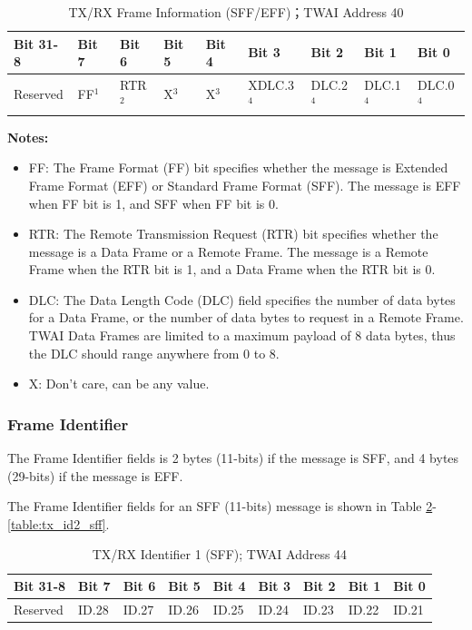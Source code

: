\documentclass[main\_\_EN.tex]{subfiles}
\begin{document}
\begin{longtable}[c]{|p{1.4cm}|p{1.4cm}|p{1.4cm}|p{1.4cm}|p{1.4cm}|p{1.4cm}|p{1.4cm}|p{1.4cm}|p{1.4cm}|}
    \caption{TX/RX Frame Information (SFF/EFF)；TWAI Address \hexprefix{}40}
    \label{table:frame_info}\\
    \hline
       \rowcolor{lightgray}
    Bit 31-8 & Bit 7 & Bit 6 & Bit 5 & Bit 4 & Bit 3 & Bit 2 & Bit 1 & Bit 0\\
    \hline
    Reserved & FF$^1$ & RTR$^2$  & X$^3$  & X$^3$  & XDLC.3$^4$ & DLC.2$^4$ & DLC.1$^4$ & DLC.0$^4$\\
    \hline
\end{longtable}
\vspace{-1.5em}
{\bfseries Notes:}\\
\begin{itemize}
    \item FF: The Frame Format (FF) bit specifies whether the message is Extended Frame Format (EFF) or Standard Frame Format (SFF). The message is EFF when FF bit is 1, and SFF when FF bit is 0.
    \item RTR: The Remote Transmission Request (RTR) bit specifies whether the message is a Data Frame or a Remote Frame. The message is a Remote Frame when the RTR bit is 1, and a Data Frame when the RTR bit is 0.
    \item DLC: The Data Length Code (DLC) field specifies the number of data bytes for a Data Frame, or the number of data bytes to request in a Remote Frame. TWAI Data Frames are limited to a maximum payload of 8 data bytes, thus the DLC should range anywhere from 0 to 8.
    \item X: Don’t care, can be any value.
\end{itemize}

\subsubsection{Frame Identifier}
The Frame Identifier fields is 2 bytes (11-bits) if the message is SFF, and 4 bytes (29-bits) if the message is EFF.

The Frame Identifier fields for an SFF (11-bits) message is shown in Table \ref{table:tx_id1_sff}-\ref{table:tx_id2_sff}.

\begin{longtable}[c]{|p{1.4cm}|p{1.4cm}|p{1.4cm}|p{1.4cm}|p{1.4cm}|p{1.4cm}|p{1.4cm}|p{1.4cm}|p{1.4cm}|}
    \caption{TX/RX Identifier 1 (SFF); TWAI Address \hexprefix{}44}
    \label{table:tx_id1_sff}\\
    \hline
       \rowcolor{lightgray}
    Bit 31-8 & Bit 7 & Bit 6 & Bit 5 & Bit 4 & Bit 3 & Bit 2 & Bit 1 & Bit 0\\
    \hline
    Reserved & ID.28 & ID.27 & ID.26 & ID.25 & ID.24 & ID.23 & ID.22 & ID.21\\
    \hline
\end{longtable}
\end{document}
